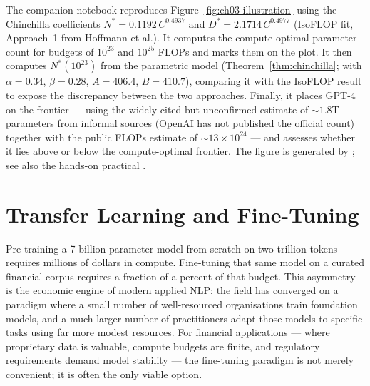 \begin{illustration}
\label{ex:ch03-illustration}
The companion notebook reproduces Figure~\ref{fig:ch03-illustration} using the
Chinchilla coefficients $N^* = 0.1192\,C^{0.4937}$ and $D^* = 2.1714\,C^{0.4977}$
(IsoFLOP fit, Approach~1 from Hoffmann et al.). It computes the compute-optimal
parameter count for budgets of $10^{23}$ and $10^{25}$ FLOPs and marks them on the
plot. It then computes $N^*(10^{23})$ from the parametric model
(Theorem~\ref{thm:chinchilla}; with $\alpha=0.34$, $\beta=0.28$, $A=406.4$,
$B=410.7$), comparing it with the IsoFLOP result to expose the discrepancy between
the two approaches. Finally, it places GPT-4 on the frontier --- using the widely
cited but unconfirmed estimate of $\sim\!1.8$T parameters from informal sources
(OpenAI has not published the official count) together with the public FLOPs
estimate of $\sim\!13\times10^{24}$ --- and assesses whether it lies above or below
the compute-optimal frontier.
The figure is generated by
\texttt{};
see also the hands-on practical
\texttt{}.
\end{illustration}


\section{Transfer Learning and Fine-Tuning}
\label{sec:finetuning}

\begin{context}
Pre-training a 7-billion-parameter model from scratch on two trillion tokens
requires millions of dollars in compute.  Fine-tuning that same model on a
curated financial corpus requires a fraction of a percent of that budget.
This asymmetry is the economic engine of modern applied NLP: the field has
converged on a paradigm where a small number of well-resourced organisations
train foundation models, and a much larger number of practitioners adapt those
models to specific tasks using far more modest resources.  For financial
applications --- where proprietary data is valuable, compute budgets are finite,
and regulatory requirements demand model stability --- the fine-tuning paradigm
is not merely convenient; it is often the only viable option.
\end{context}

